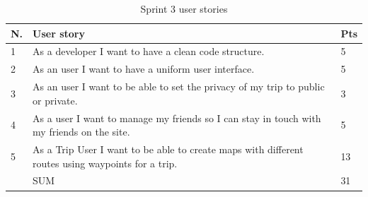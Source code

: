 \documentclass[a4paper]{article}
\begin{document}
\begin{table}[!h]
  \centering
  \begin{tabulary}{1.0\linewidth}{|L|L|L|}
    \hline
    N. & User story & Pts \\ & As a developer I want to have a clean code structure.
    & 5 \\ \hline

    2& As an user I want to have a uniform user interface.
    & 5 \\ \hline

    3& As an user I want to be able to set the privacy of my trip to public or private.
    & 3 \\ \hline

    4&As a user I want to manage my friends so I can stay in touch with my friends on the site.
    & 5 \\ \hline

    5& As a Trip User I want to be able to create maps with different routes using waypoints for a trip.
    & 13 \\ \hline

    & SUM & 31 \\ \hline
  \end{tabulary}
  \caption{Sprint 3 user stories}
\label{tab:sprint3}
\end{table}
\end{document}
